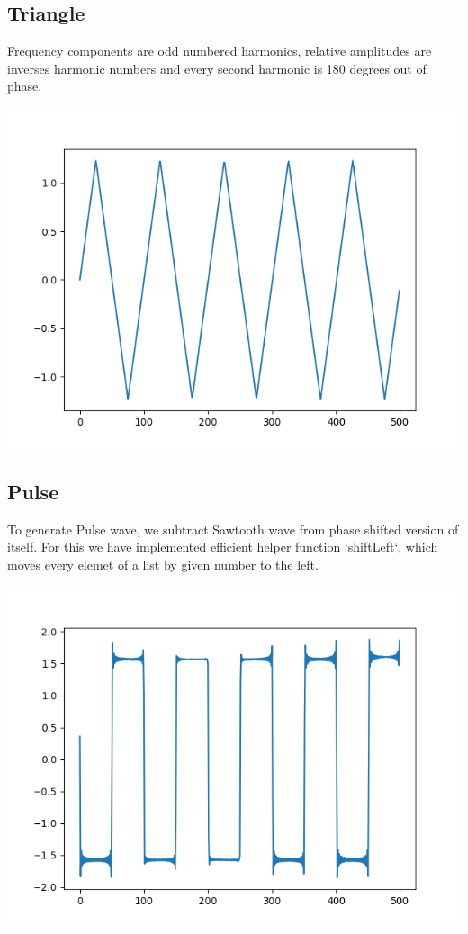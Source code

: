 \documentclass{article}
\begin{document}
\subsection{Triangle}
Frequency components are odd numbered harmonics, relative amplitudes are inverses harmonic numbers and every second harmonic is 180 degrees out of phase. 

\begin{center}
    \includegraphics{triangle.png}
\end{center}


\subsection{Pulse}
To generate Pulse wave, we subtract Sawtooth wave from phase shifted version of itself. For this we have implemented efficient helper function `shiftLeft`, which moves every elemet of a list by given number to the left.  
\begin{center}
    \includegraphics{pulse.png}
\end{center}
\end{document}

